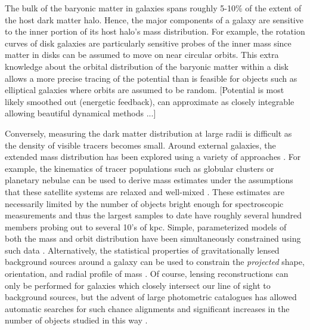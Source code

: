 \documentclass[letterpaper,12pt,preprint]{aastex}
\begin{document}
The bulk of the baryonic matter in galaxies spans roughly 5-10\% of the extent of the host dark matter halo. Hence, the major components of a galaxy are sensitive to the inner portion of its host halo's mass distribution. For example, the rotation curves of disk galaxies are particularly sensitive probes of the inner mass since matter in disks can be assumed to move on near circular orbits. This extra knowledge about the orbital distribution of the baryonic matter within a disk allows a more precise tracing of the potential than is feasible for objects such as elliptical galaxies where orbits are assumed to be random. [Potential is most likely smoothed out (energetic feedback), can approximate as closely integrable allowing beautiful dynamical methods ...]

Conversely, measuring the dark matter distribution at large radii is difficult as the density of visible tracers becomes small. Around external galaxies, the extended mass distribution has been explored using a variety of approaches \citep[see][for a a complete and detailed review]{courteau12}. For example, the kinematics of tracer populations such as globular clusters or planetary nebulae can be used to derive mass estimates under the assumptions that these satellite systems are relaxed and well-mixed \citep[early investigations include][]{mendez01,cote03}. These estimates are necessarily limited by the number of objects bright enough for spectroscopic measurements and thus the largest samples to date have roughly several hundred members probing out to several 10's of kpc. Simple, parameterized models of both the mass and orbit distribution have been simultaneously constrained using such data \citep[e.g.][]{napolitano11,deason12a}. 
Alternatively, the statistical properties of gravitationally lensed background sources around a galaxy can be used to constrain the \emph{projected} shape, orientation, and radial profile of mass \citep[as done by the Lens Structure and Dynamics Survey described in][]{koopmans02}. Of course, lensing reconstructions can only be performed for galaxies which closely intersect our line of sight to background sources, but the advent of large photometric catalogues has allowed automatic searches for such chance alignments and significant increases in the number of objects studied in this way \citep[e.g. the Sloan Lens ACS Survey, see][]{bolton06}.
\end{document}
